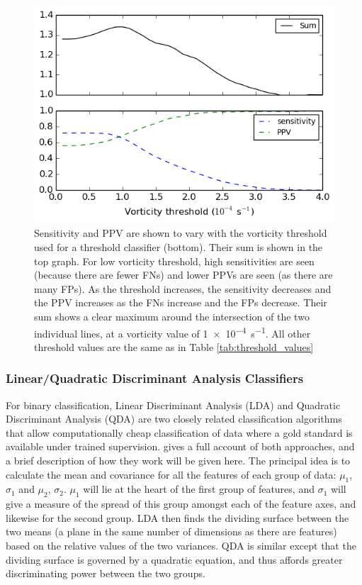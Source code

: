 \documentclass[pdftex,12pt,a4paper]{report}
\begin{document}
\begin{figure}[ht!]
    \centering
    \includegraphics[width=\textwidth]{figures/threshold_sens_ppv_vort}
    \vspace{-10pt}
    \caption{Sensitivity and PPV are shown to vary with the vorticity threshold used for a threshold
        classifier (bottom). Their sum is shown in the top graph. For low vorticity threshold, high
        sensitivities are seen (because there are fewer FNs) and lower PPVs are seen (as there are
        many FPs). As the threshold increases, the sensitivity decreases and the PPV increases as
        the FNs increase and the FPs decrease. Their sum shows a clear maximum around the
        intersection of the two individual lines, at a vorticity value of \SI{1e-4}{s^{-1}}. All
        other threshold values are the same as in Table \ref{tab:threshold_values} }
    \label{fig:threshold_sens_ppv_vort}
\end{figure}

\subsubsection{Linear/Quadratic Discriminant Analysis Classifiers}

For binary classification, Linear Discriminant Analysis (LDA) and Quadratic Discriminant Analysis
(QDA) are two closely related classification algorithms that allow computationally cheap
classification of data where a gold standard is available under trained supervision.
\textcite{mclachlan2004discriminant} gives a full account of both approaches, and a brief description of how they
work will be given here. The principal idea is to calculate the mean and covariance for all the
features of each group of data: $\mu_1$, $\sigma_1$ and $\mu_2$, $\sigma_2$. $\mu_1$ will lie at the
heart of the first group of features, and $\sigma_1$ will give a measure of the spread of this group
amongst each of the feature axes, and likewise for the second group. LDA then finds the dividing
surface between the two means (a plane in the same number of dimensions as there are features) based
on the relative values of the two variances. QDA is similar except that the dividing surface is
governed by a quadratic equation, and thus affords greater discriminating power between the two
groups.
\end{document}
